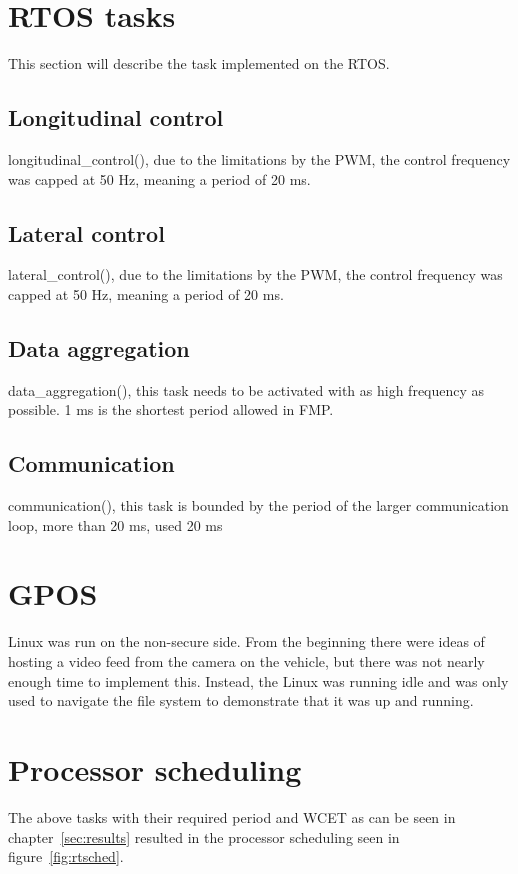 \section{RTOS tasks}
This section will describe the task implemented on the RTOS.

\subsection{Longitudinal control}
longitudinal\_control(), due to the limitations by the PWM, the control frequency was capped at 50 Hz, meaning a period of 20 ms. 

\subsection{Lateral control}
lateral\_control(), due to the limitations by the PWM, the control frequency was capped at 50 Hz, meaning a period of 20 ms.

\subsection{Data aggregation}
data\_aggregation(), this task needs to be activated with as high frequency as possible. 1 ms is the shortest period allowed in FMP.

\subsection{Communication}
communication(), this task is bounded by the period of the larger communication loop, more than 20 ms, used 20 ms

\section{GPOS}
Linux was run on the non-secure side. From the beginning there were ideas of hosting a video feed from the camera on the vehicle, but there was not nearly enough time to implement this. Instead, the Linux was running idle and was only used to navigate the file system to demonstrate that it was up and running. 

\section{Processor scheduling}
The above tasks with their required period and WCET as can be seen in chapter~\ref{sec:results} resulted in the processor scheduling seen in figure~\ref{fig:rtsched}.

